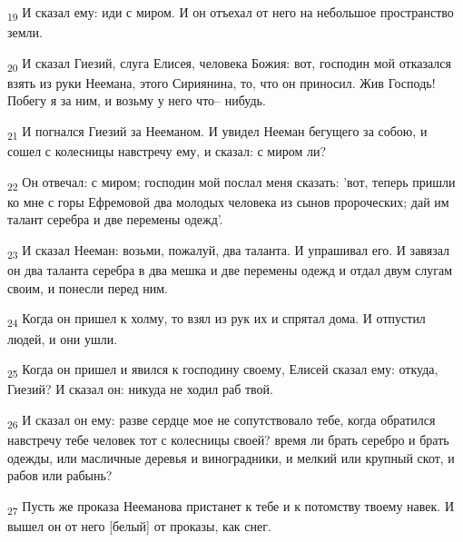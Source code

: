 \begin{tcolorbox}
\textsubscript{19} И сказал ему: иди с миром. И он отъехал от него на небольшое пространство земли.
\end{tcolorbox}
\begin{tcolorbox}
\textsubscript{20} И сказал Гиезий, слуга Елисея, человека Божия: вот, господин мой отказался взять из руки Неемана, этого Сириянина, то, что он приносил. Жив Господь! Побегу я за ним, и возьму у него что-- нибудь.
\end{tcolorbox}
\begin{tcolorbox}
\textsubscript{21} И погнался Гиезий за Нееманом. И увидел Нееман бегущего за собою, и сошел с колесницы навстречу ему, и сказал: с миром ли?
\end{tcolorbox}
\begin{tcolorbox}
\textsubscript{22} Он отвечал: с миром; господин мой послал меня сказать: 'вот, теперь пришли ко мне с горы Ефремовой два молодых человека из сынов пророческих; дай им талант серебра и две перемены одежд'.
\end{tcolorbox}
\begin{tcolorbox}
\textsubscript{23} И сказал Нееман: возьми, пожалуй, два таланта. И упрашивал его. И завязал он два таланта серебра в два мешка и две перемены одежд и отдал двум слугам своим, и понесли перед ним.
\end{tcolorbox}
\begin{tcolorbox}
\textsubscript{24} Когда он пришел к холму, то взял из рук их и спрятал дома. И отпустил людей, и они ушли.
\end{tcolorbox}
\begin{tcolorbox}
\textsubscript{25} Когда он пришел и явился к господину своему, Елисей сказал ему: откуда, Гиезий? И сказал он: никуда не ходил раб твой.
\end{tcolorbox}
\begin{tcolorbox}
\textsubscript{26} И сказал он ему: разве сердце мое не сопутствовало тебе, когда обратился навстречу тебе человек тот с колесницы своей? время ли брать серебро и брать одежды, или масличные деревья и виноградники, и мелкий или крупный скот, и рабов или рабынь?
\end{tcolorbox}
\begin{tcolorbox}
\textsubscript{27} Пусть же проказа Нееманова пристанет к тебе и к потомству твоему навек. И вышел он от него [белый] от проказы, как снег.
\end{tcolorbox}
